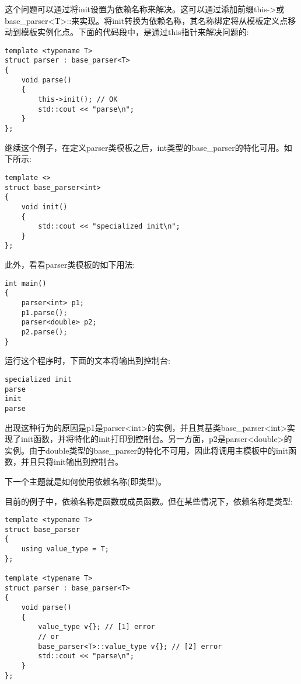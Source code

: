 这个问题可以通过将init设置为依赖名称来解决。这可以通过添加前缀this->或base\_parser<T>::来实现。将init转换为依赖名称，其名称绑定将从模板定义点移动到模板实例化点。下面的代码段中，是通过this指针来解决问题的:

\begin{lstlisting}[style=styleCXX]
template <typename T>
struct parser : base_parser<T>
{
	void parse()
	{
		this->init(); // OK
		std::cout << "parse\n";
	}
};
\end{lstlisting}

继续这个例子，在定义parser类模板之后，int类型的base\_parser的特化可用。如下所示:

\begin{lstlisting}[style=styleCXX]
template <>
struct base_parser<int>
{
	void init()
	{
		std::cout << "specialized init\n";
	}
};
\end{lstlisting}

此外，看看parser类模板的如下用法:

\begin{lstlisting}[style=styleCXX]
int main()
{
	parser<int> p1;
	p1.parse();
	parser<double> p2;
	p2.parse();
}
\end{lstlisting}

运行这个程序时，下面的文本将输出到控制台:

\begin{lstlisting}[style=styleCXX]
specialized init
parse
init
parse
\end{lstlisting}

出现这种行为的原因是p1是parser<int>的实例，并且其基类base\_parser<int>实现了init函数，并将特化的init打印到控制台。另一方面，p2是parser<double>的实例。由于double类型的base\_parser的特化不可用，因此将调用主模板中的init函数，并且只将init输出到控制台。

下一个主题就是如何使用依赖名称(即类型)。


目前的例子中，依赖名称是函数或成员函数。但在某些情况下，依赖名称是类型:

\begin{lstlisting}[style=styleCXX]
template <typename T>
struct base_parser
{
	using value_type = T;
};

template <typename T>
struct parser : base_parser<T>
{
	void parse()
	{
		value_type v{}; // [1] error
		// or
		base_parser<T>::value_type v{}; // [2] error
		std::cout << "parse\n";
	}
};
\end{lstlisting}

